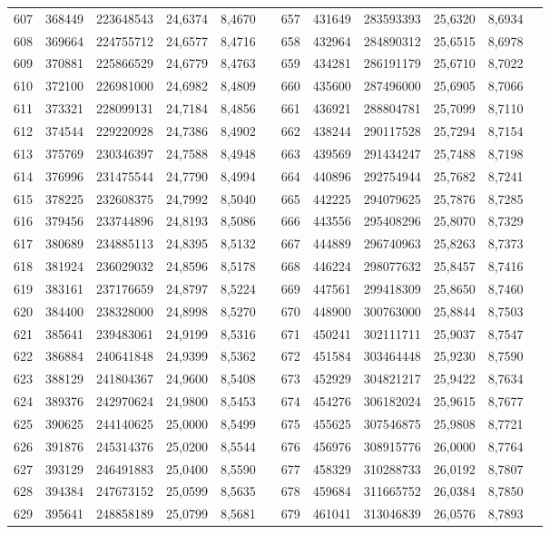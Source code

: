 \begin{longtable}{p{.17\linewidth}*{11}{S}}
607&368449&223648543&24,6374&8,4670&&657&431649&283593393&25,6320&8,6934\\
608&369664&224755712&24,6577&8,4716&&658&432964&284890312&25,6515&8,6978\\
609&370881&225866529&24,6779&8,4763&&659&434281&286191179&25,6710&8,7022\\
610&372100&226981000&24,6982&8,4809&&660&435600&287496000&25,6905&8,7066\\
611&373321&228099131&24,7184&8,4856&&661&436921&288804781&25,7099&8,7110\\
612&374544&229220928&24,7386&8,4902&&662&438244&290117528&25,7294&8,7154\\
613&375769&230346397&24,7588&8,4948&&663&439569&291434247&25,7488&8,7198\\
614&376996&231475544&24,7790&8,4994&&664&440896&292754944&25,7682&8,7241\\
615&378225&232608375&24,7992&8,5040&&665&442225&294079625&25,7876&8,7285\\
616&379456&233744896&24,8193&8,5086&&666&443556&295408296&25,8070&8,7329\\
617&380689&234885113&24,8395&8,5132&&667&444889&296740963&25,8263&8,7373\\
618&381924&236029032&24,8596&8,5178&&668&446224&298077632&25,8457&8,7416\\
619&383161&237176659&24,8797&8,5224&&669&447561&299418309&25,8650&8,7460\\
620&384400&238328000&24,8998&8,5270&&670&448900&300763000&25,8844&8,7503\\
621&385641&239483061&24,9199&8,5316&&671&450241&302111711&25,9037&8,7547\\
622&386884&240641848&24,9399&8,5362&&672&451584&303464448&25,9230&8,7590\\
623&388129&241804367&24,9600&8,5408&&673&452929&304821217&25,9422&8,7634\\
624&389376&242970624&24,9800&8,5453&&674&454276&306182024&25,9615&8,7677\\
625&390625&244140625&25,0000&8,5499&&675&455625&307546875&25,9808&8,7721\\
626&391876&245314376&25,0200&8,5544&&676&456976&308915776&26,0000&8,7764\\
627&393129&246491883&25,0400&8,5590&&677&458329&310288733&26,0192&8,7807\\
628&394384&247673152&25,0599&8,5635&&678&459684&311665752&26,0384&8,7850\\
629&395641&248858189&25,0799&8,5681&&679&461041&313046839&26,0576&8,7893\\

\end{longtable}
